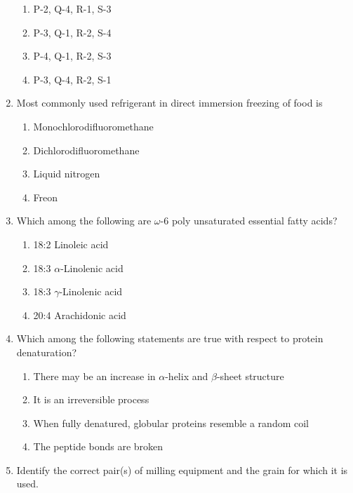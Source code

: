 \documentclass[a4paper,10pt]{article}
\begin{document}
\begin{enumerate}
\hfill{}
\begin{enumerate}
    \item P-2, Q-4, R-1, S-3
    \item P-3, Q-1, R-2, S-4
    \item P-4, Q-1, R-2, S-3
    \item P-3, Q-4, R-2, S-1
\end{enumerate}

\item Most commonly used refrigerant in direct immersion freezing of food is

\hfill{}
\begin{enumerate}
    \item Monochlorodifluoromethane
    \item Dichlorodifluoromethane
    \item Liquid nitrogen
    \item Freon
\end{enumerate}

\item Which among the following are $\omega$-6 poly unsaturated essential fatty acids?

\hfill{}
\begin{enumerate}
    \item 18:2 Linoleic acid
    \item 18:3 $\alpha$-Linolenic acid
    \item 18:3 $\gamma$-Linolenic acid
    \item 20:4 Arachidonic acid
\end{enumerate}

\item Which among the following statements are true with respect to protein denaturation?

\hfill{}
\begin{enumerate}
    \item There may be an increase in $\alpha$-helix and $\beta$-sheet structure
    \item It is an irreversible process
    \item When fully denatured, globular proteins resemble a random coil
    \item The peptide bonds are broken
\end{enumerate}

\item Identify the correct pair(s) of milling equipment and the grain for which it is used.


\end{enumerate}
\end{document}
